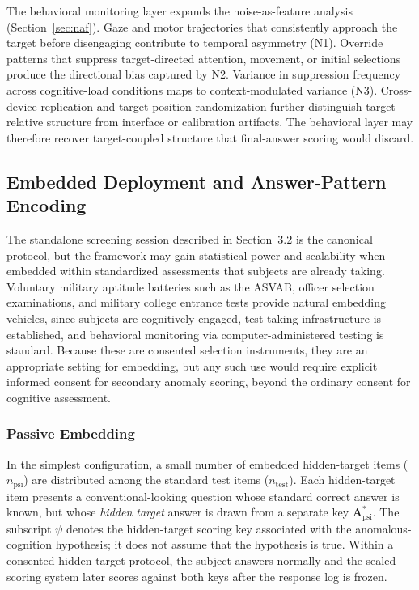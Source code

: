 \documentclass[11pt,letterpaper]{article}
\begin{document}
The behavioral monitoring layer expands the noise-as-feature analysis (Section~\ref{sec:naf}). Gaze and motor trajectories that consistently approach the target before disengaging contribute to temporal asymmetry (N1). Override patterns that suppress target-directed attention, movement, or initial selections produce the directional bias captured by N2. Variance in suppression frequency across cognitive-load conditions maps to context-modulated variance (N3). Cross-device replication and target-position randomization further distinguish target-relative structure from interface or calibration artifacts. The behavioral layer may therefore recover target-coupled structure that final-answer scoring would discard.

\subsection{Embedded Deployment and Answer-Pattern Encoding}

The standalone screening session described in Section~3.2 is the canonical protocol, but the framework may gain statistical power and scalability when embedded within standardized assessments that subjects are already taking. Voluntary military aptitude batteries such as the ASVAB, officer selection examinations, and military college entrance tests provide natural embedding vehicles, since subjects are cognitively engaged, test-taking infrastructure is established, and behavioral monitoring via computer-administered testing is standard. Because these are consented selection instruments, they are an appropriate setting for embedding, but any such use would require explicit informed consent for secondary anomaly scoring, beyond the ordinary consent for cognitive assessment.

\subsubsection{Passive Embedding}

In the simplest configuration, a small number of embedded hidden-target items ($n_{\text{psi}}$) are distributed among the standard test items ($n_{\text{test}}$). Each hidden-target item presents a conventional-looking question whose standard correct answer is known, but whose \textit{hidden target} answer is drawn from a separate key $\mathbf{A}^*_{\text{psi}}$. The subscript $\psi$ denotes the hidden-target scoring key associated with the anomalous-cognition hypothesis; it does not assume that the hypothesis is true. Within a consented hidden-target protocol, the subject answers normally and the sealed scoring system later scores against both keys after the response log is frozen.
\end{document}
